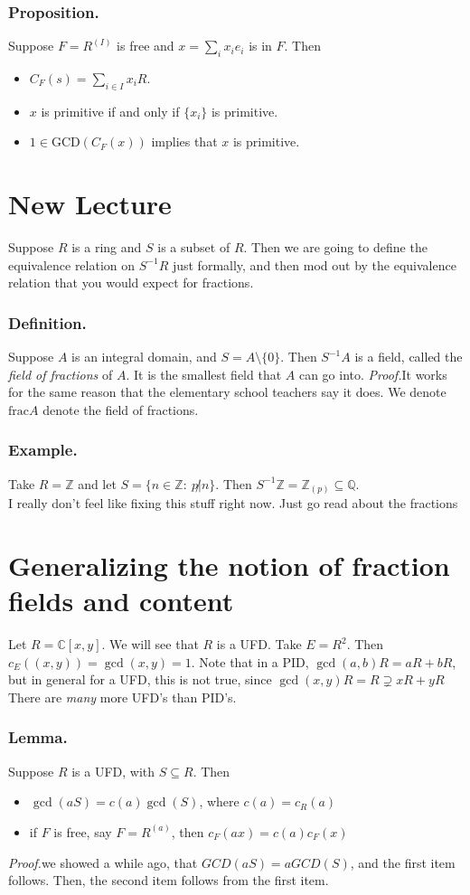 \documentclass{article}
\newcommand{\vs}{\bigskip\\\text{}}
\newcommand{\beginproof}{\vspace{10pt}\newline\textit{Proof.}\hspace{1em}}
\begin{document}
\subsubsection{Proposition.} Suppose $F = R^{(I)}$ is free and $x =
\sum_ix_ie_i$ is in $F$. Then 
\begin{itemize}
\item $C_F(s) = \sum_{i\in I}x_iR$.
\item $x$ is primitive if and only if $\{x_i\}$ is primitive.
\item $1 \in \text{GCD}(C_F(x))$ implies that $x$ is primitive.
\end{itemize}  
\section{New Lecture}
Suppose $R$ is a ring and $S$ is a subset of $R$. Then we are going to define the equivalence relation on $S^{-1}R$ just
formally, and then mod out by the equivalence relation that you would expect for fractions.
\subsubsection{Definition.} Suppose $A$ is an integral domain, and $S = A\setminus\{0\}$. Then $S^{-1}A$ is a field, called the
\textit{field of fractions} of $A$. It is the smallest field that $A$ can go into. 
\beginproof It works for the same reason that the elementary school teachers say it does. We denote $\text{frac}A$
denote the field of fractions.
\subsubsection{Example.} Take $R = \mathbb{Z}$ and let $S =\{n \in \mathbb{Z}: \: p \not | n\}$. Then $S^{-1}\mathbb
Z= \mathbb Z_{(p)} \subseteq \mathbb Q$.\vs
I really don't feel like fixing this stuff right now. Just go read about the fractions
\section{Generalizing the notion of fraction fields and content}
Let $R = \mathbb{C}[x,y]$. We will see that $R$ is a UFD. Take $E = R^{2}$. Then $c_E((x,y)) = \gcd(x,y) = 1$. Note that
in a PID, $\gcd(a,b)R = aR + bR$, but in general for a UFD, this is not true, since $\gcd(x,y)R = R \supsetneq xR + yR$
There are \textit{many} more UFD's than PID's.
\subsubsection{Lemma.} Suppose $R$ is a UFD, with $S\subseteq R$. Then \begin{itemize}
\item $\gcd(aS) = c(a)\gcd(S)$, where $c(a) = c_R(a)$
\item if $F$ is free, say $F = R^{(a)}$, then $c_F(ax) = c(a) c_F(x)$
\end{itemize} 
\text{}
\beginproof we showed a while ago, that $GCD(aS) = a GCD(S)$, and the first item follows. Then, the second item follows
from the first item.
\end{document}

